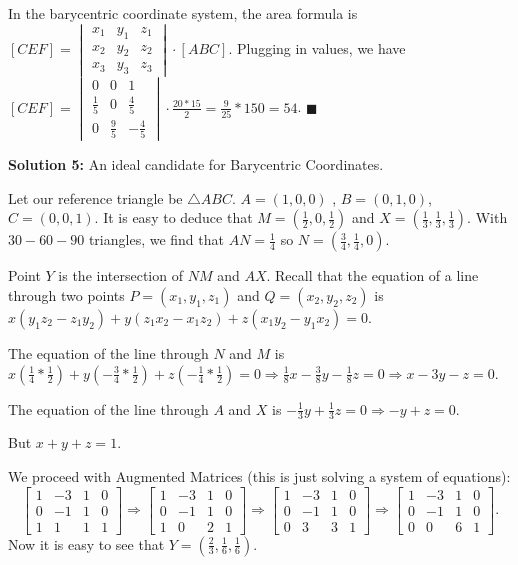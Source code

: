 \documentclass{article}
\begin{document}
In the barycentric coordinate system, the area formula is $[CEF]=\begin{vmatrix}
x_{1} &y_{1}  &z_{1} \\ 
x_{2} &y_{2}  &z_{2} \\ 
 x_{3}& y_{3} & z_{3}
\end{vmatrix}\cdot [ABC]$. Plugging in values, we have $[CEF]=\begin{vmatrix}
0 &0  &1 \\ 
\frac 15 &0  &\frac 45 \\ 
 0& \frac 95& -\frac 45
\end{vmatrix}\cdot \frac{20*15}2 =\frac{9}{25}*150=54$. $\blacksquare$ 
\vspace{.2in}


\textbf{Solution 5:}
An ideal candidate for Barycentric Coordinates. 

Let our reference triangle be $\triangle ABC$. $A=(1,0,0)$ , $B=(0,1,0)$, $C=(0,0,1)$. It is easy to deduce that $M=(\frac 12,0,\frac 12)$ and $X=(\frac 13, \frac 13, \frac 13)$. With $30-60-90$ triangles, we find that $AN=\frac 14$ so $N=(\frac 34, \frac 14,0)$. 

Point $Y$ is the intersection of $NM$ and $AX$. Recall that the equation of a line through two points $P=(x_1,y_1,z_1)$ and $Q=(x_2,y_2,z_2)$ is $x(y_1z_2 -z_1y_2)+y(z_1x_2-x_1z_2)+z(x_1y_2-y_1x_2)=0$.

The equation of the line through $N$ and $M$ is $x(\frac 14 *\frac 12)+y(-\frac 34 *\frac 12)+z(-\frac 14 *\frac 12)=0 \Rightarrow \frac 18 x-\frac 38 y - \frac 18 z=0\Rightarrow x-3y-z=0$. 

The equation of the line through $A$ and $X$ is $-\frac 13 y+\frac 13 z=0 \Rightarrow -y+z=0$. 

But $x+y+z=1$. 

We proceed with Augmented Matrices (this is just solving a system of equations): $$ \begin{bmatrix}
1 & -3 & 1 &0\\
0& -1 & 1 &0\\
1&1&1&1
\end{bmatrix}\Rightarrow \begin{bmatrix}
1 & -3 & 1 &0\\
0& -1 & 1 &0\\
1&0&2&1
\end{bmatrix}\Rightarrow \begin{bmatrix}
1 & -3 & 1 &0\\
0& -1 & 1 &0\\
0&3&3&1
\end{bmatrix}\Rightarrow \begin{bmatrix}
1 & -3 & 1 &0\\
0& -1 & 1 &0\\
0&0&6&1
\end{bmatrix}.$$ Now it is easy to see that $Y=(\frac 23,\frac 16,\frac 16)$.
\end{document}
